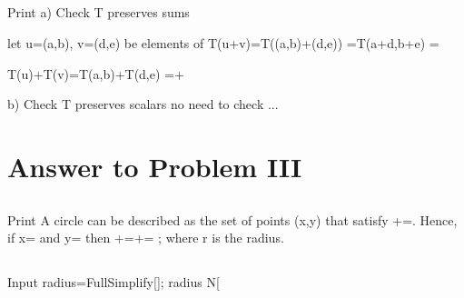 \documentclass[11pt,a4paper]{article}
\begin{document}
\clearpage

\subsection{}
\begin{mmaCell}[moredefined={T}]{Print}
a) Check T preserves sums

let u=(a,b), v=(d,e) be elements of 
T(u+v)=T((a,b)+(d,e))
      =T(a+d,b+e)
      =

T(u)+T(v)=T(a,b)+T(d,e)
         =+


b) Check T preserves scalars
no need to check ...
\end{mmaCell}

\clearpage

\section{Answer to Problem III}\label{sec:P03}

\subsection{}
\begin{mmaCell}{Print}
A circle can be described as the set of points (x,y) that satisfy
+=. Hence, if x= and y= then
+=+= ; where r is the radius.
\end{mmaCell}

\subsection{}
\begin{mmaCell}{Input}
radius=FullSimplify[];
radius
N[%
\end{mmaCell}
\end{document}
